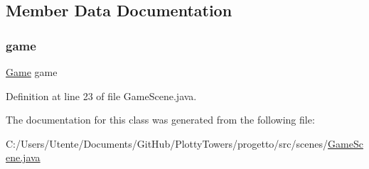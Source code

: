 \subsection{Member Data Documentation}
\mbox{\label{classscenes_1_1_game_scene_ac6a5ed6191fcf3a5bf0445921feb4f48}} 
\subsubsection{\texorpdfstring{game}{game}}
{\footnotesize\ttfamily \hyperlink{classprogetto_1_1_game}{Game} game\hspace{0.3cm}{\ttfamily [protected]}}



Definition at line 23 of file Game\+Scene.\+java.



The documentation for this class was generated from the following file\+:\begin{DoxyCompactItemize}
\item 
C\+:/\+Users/\+Utente/\+Documents/\+Git\+Hub/\+Plotty\+Towers/progetto/src/scenes/\hyperlink{_game_scene_8java}{Game\+Scene.\+java}\end{DoxyCompactItemize}
